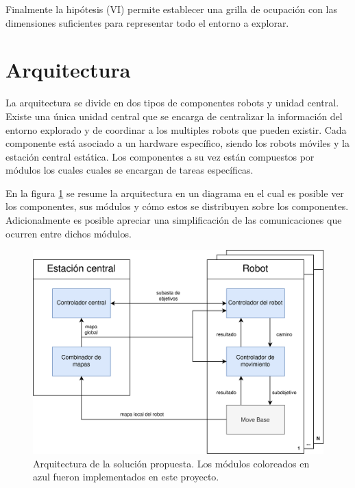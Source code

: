 Finalmente la hipótesis (VI) permite establecer una grilla de ocupación con las
dimensiones suficientes para representar todo el entorno a explorar. 

\section{Arquitectura}\label{sec:arqui}
La arquitectura se divide en dos tipos de componentes robots y unidad central.
Existe una única unidad central que se encarga de centralizar la información
del entorno explorado y de coordinar a los multiples robots que pueden existir.
Cada componente está asociado a un hardware específico, siendo los robots móviles
y la estación central estática. 
Los componentes a su vez están compuestos por módulos los cuales cuales se encargan
de tareas específicas. 

En la figura \ref{fig:arquitectura} se resume la arquitectura en un diagrama en
el cual es posible ver los componentes, sus módulos y cómo estos se distribuyen
sobre los componentes. Adicionalmente es posible apreciar una simplificación de las
comunicaciones que ocurren entre dichos módulos.


\begin{figure}[H]
  \center
  \includegraphics[width=1\linewidth]{imagenes/arquitectura.png}
  \caption[Arquitectura de la solución propuesta.]{Arquitectura de la solución propuesta. Los módulos coloreados en azul fueron implementados en este proyecto.}
  \label{fig:arquitectura}
\end{figure} 


